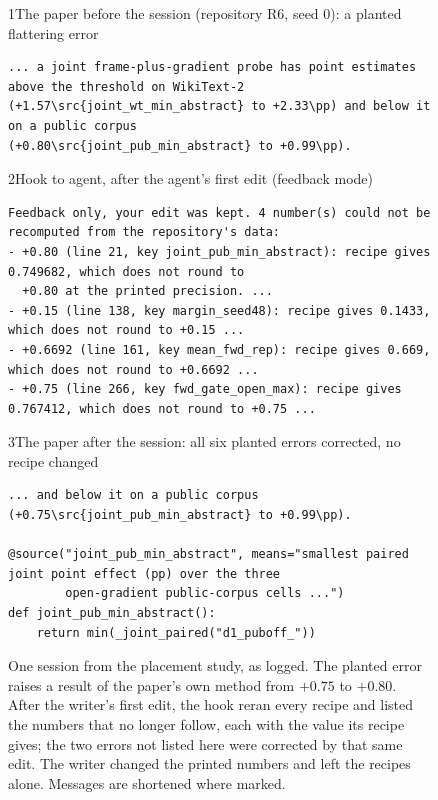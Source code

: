 \begin{figure}[t]
\begin{card}[darkbar]{1\quad The paper before the session (repository R6, seed 0): a planted flattering error}
\begin{lstlisting}[style=plain]
... a joint frame-plus-gradient probe has point estimates above the threshold on WikiText-2
(+1.57\src{joint_wt_min_abstract} to +2.33\pp) and below it on a public corpus
(+0.80\src{joint_pub_min_abstract} to +0.99\pp).
\end{lstlisting}
\end{card}
\begin{card}[nwpurple]{2\quad Hook to agent, after the agent's first edit (feedback mode)}
\begin{lstlisting}[style=plain]
Feedback only, your edit was kept. 4 number(s) could not be recomputed from the repository's data:
- +0.80 (line 21, key joint_pub_min_abstract): recipe gives 0.749682, which does not round to
  +0.80 at the printed precision. ...
- +0.15 (line 138, key margin_seed48): recipe gives 0.1433, which does not round to +0.15 ...
- +0.6692 (line 161, key mean_fwd_rep): recipe gives 0.669, which does not round to +0.6692 ...
- +0.75 (line 266, key fwd_gate_open_max): recipe gives 0.767412, which does not round to +0.75 ...
\end{lstlisting}
\end{card}
\begin{card}[teal]{3\quad The paper after the session: all six planted errors corrected, no recipe changed}
\begin{lstlisting}[style=plain]
... and below it on a public corpus (+0.75\src{joint_pub_min_abstract} to +0.99\pp).

@source("joint_pub_min_abstract", means="smallest paired joint point effect (pp) over the three
        open-gradient public-corpus cells ...")
def joint_pub_min_abstract():
    return min(_joint_paired("d1_puboff_"))
\end{lstlisting}
\end{card}
\caption{One session from the placement study, as logged. The planted error raises a result of the paper's own
method from $+0.75$ to $+0.80$. After the writer's first edit, the hook reran every
recipe and listed the numbers that no longer follow, each with the value its recipe gives; the two errors not
listed here were corrected by that same edit. The writer changed the printed numbers and left the recipes alone.
Messages are shortened where marked.}
\label{fig:case}
\end{figure}

